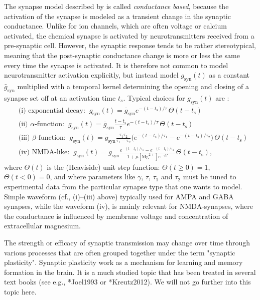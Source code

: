 The synapse model described by  is called \textit{conductance based}, because the activation of the synapse is modeled as a transient change in the synaptic conductance. Unlike for ion channels, which are often voltage or calcium activated, the chemical synapse is activated by neurotransmitters received from a pre-synaptic cell. However, the synaptic response tends to be rather stereotypical, meaning that the post-synaptic conductance change is more or less the same every time the synapse is activated. It is therefore not common to model neurotransmitter activation explicitly, but instead model $g_\text{syn}(t)$ as a constant $\bar{g}_\text{syn}$ multiplied with a temporal kernel determining the opening and closing of a synapse set off at an activation time $t_s$. Typical choices for $g_\text{syn}(t)$ are : 
\begin{align}
&\text{(i) exponential decay:} \;\; g_\text{syn}(t) = \bar{g}_\text{syn} e^{-(t-t_\text{s})/\tau}\, \Theta(t-t_\text{s}) \\
&\text{(ii) $\alpha$-function:} \;\; g_\text{syn}(t) = \bar{g}_\text{syn} \frac{t-t_\text{s}}{\tau} e^{-(t-t_\text{s})/\tau} \, \Theta(t-t_\text{s}) \\
&\text{(iii) $\beta$-function:} \;\; g_\text{syn}(t) = \bar{g}_\text{syn} \frac{\tau_1 \tau_2}{\tau_1-\tau_2} 
\Big( e^{-(t-t_\text{s})/\tau_1} - e^{-(t-t_\text{s})/\tau_2} \Big) \, \Theta(t-t_\text{s}) \\
& \text{(iv) NMDA-like:} \;\; g_\text{syn}(t) = \bar{g}_\text{syn} \frac{e^{-(t-t_\text{s})/\tau_1} - e^{-(t-t_\text{s})/\tau_2}} {1+\mu [\text{Mg}^{2+}] e^{-\gamma V} } \, \Theta(t-t_\text{s}),
\label{eq:Neuron:sf4}
\end{align}
where $\Theta(t)$ is the (Heaviside) unit step function: $\Theta(t \ge 0)=1$,  $\Theta(t< 0)=0$, and where parameters like $\gamma$,  $\tau$, $\tau_1$ and $\tau_2$ must be tuned to experimental data from the particular synapse type that one wants to model. Simple waveform (cf., (i)--(iii) above) typically used for AMPA  and GABA synapses, while the waveform (iv), is mainly relevant for NMDA-synapses, where the conductance is influenced by membrane voltage and concentration of extracellular magnesium. 

The strength or efficacy of synaptic transmission may change over time through various processes that are often grouped together under the term "synaptic plasticity". Synaptic plasticity work as a mechanism for learning and memory formation in the brain. It is a much studied topic that has been treated in several text books (see e.g., \citeasnoun**{Joel1993} or \citeasnoun**{Kreutz2012}). We will not go further into this topic here.


